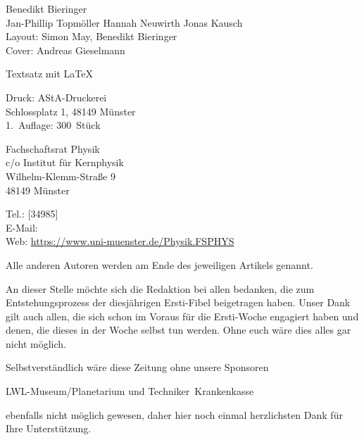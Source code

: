 \begin{multicols*}{2}
{\centering
	\vspace{-1ex}
	\vspace{-1ex}
	Benedikt Bieringer\\
	Jan-Phillip Topmöller
	Hannah Neuwirth
	Jonas Kausch\\
	
	\footnotesize
	Layout: Simon May, Benedikt Bieringer\\
	Cover: Andreas Gieselmann
	
	Textsatz mit \LaTeX
	
	Druck: AStA-Druckerei\\
	Schlossplatz 1, 48149 Münster\\
	1.~Auflage: 300~Stück

	\vspace{-1ex}
	\vspace{-1ex}
	Fachschaftsrat Physik\\
	c/o Institut für Kernphysik\\
	Wilhelm-Klemm-Straße 9\\
	48149 Münster
	
	Tel.: [34985]\\
	E-Mail: \\
	Web: \url{https://www.uni-muenster.de/Physik.FSPHYS}
\par}

\footnotesize
Alle anderen Autoren werden am Ende des jeweiligen
Artikels genannt.

An dieser Stelle möchte sich die Redaktion bei allen bedanken, die zum Entstehungsprozess der diesjährigen Ersti-Fibel beigetragen haben.
%
Unser Dank gilt auch allen, die sich schon im Voraus für die Ersti-Woche engagiert haben und denen, die dieses in der Woche selbst tun werden.
Ohne euch wäre dies alles gar nicht möglich.

Selbstverständlich wäre diese Zeitung ohne unsere Sponsoren
\begin{center}
	LWL-Museum/Planetarium und Techniker~Krankenkasse
\end{center}
ebenfalls nicht möglich gewesen, daher hier noch einmal herzlichsten Dank für Ihre Unterstützung.
\end{multicols*}

